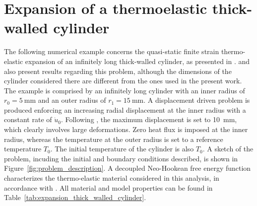 %

\section{Expansion of a thermoelastic thick-walled cylinder}

The following numerical example concerns the quasi-static finite strain thermo-elastic expansion of an infinitely long thick-walled cylinder, as presented in \cite{ibrahimbegovic_thermodynamics_2009}.
\cite{armero_new_1992} and \cite{erbts_accelerated_2012} also present results regarding this problem, although the dimensions of the cylinder considered there are different from the ones used in the present work.
The example is comprised by an infinitely long cylinder with an inner radius of \(r_{0}=\SI{5}{\milli\meter}\) and an outer radius of \(r_{1}=\SI{15}{\milli\meter}\).
A displacement driven problem is produced enforcing an increasing radial displacement at the inner radius with a constant rate of \(\dot{u}_{0}\).
Following \cite{ibrahimbegovic_thermodynamics_2009}, the maximum displacement is set to \SI{10}{\milli\meter}, which clearly involves large deformations.
Zero heat flux is imposed at the inner radius, whereas the temperature at the outer radius is set to a reference temperature \(T_{0}\).
The initial temperature of the cylinder is also \(T_0\).
A sketch of the problem, incuding the initial and boundary conditions described, is shown in Figure~\ref{fig:problem_description}.
A decoupled Neo-Hookean free energy function characterizes the thermo-elastic material considered in this analysis, in accordance with \cite{armero_new_1992}.
All material and model properties can be found in Table~\ref{tab:expansion_thick_walled_cylinder}.

